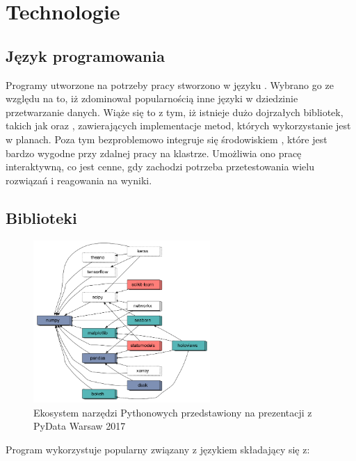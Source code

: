 \section{Technologie}\label{sec:technologie}

\subsection{Język programowania}

Programy utworzone na potrzeby pracy stworzono w języku . Wybrano go
ze względu na to, iż zdominował popularnością inne języki w dziedzinie przetwarzanie danych.
Wiąże się to z tym, iż istnieje dużo dojrzałych bibliotek, takich jak 
oraz , zawierających implementacje metod, których wykorzystanie jest w planach.
Poza tym bezproblemowo integruje się środowiskiem , które jest bardzo wygodne przy
zdalnej pracy na klastrze. Umożliwia ono pracę interaktywną, co jest cenne, gdy zachodzi
potrzeba przetestowania wielu rozwiązań i reagowania na wyniki.

\subsection{Biblioteki}

\begin{figure}[H]
    \centering
    \includegraphics[width=0.6\textwidth]{images/3_3_ecosystem}
    \caption{Ekosystem narzędzi Pythonowych przedstawiony na prezentacji z PyData Warsaw 2017\cite{thePythonEcosystem}}
    \label{fig:3_3_ecosystem}
\end{figure}

Program wykorzystuje popularny  związany z językiem  składający się z:

